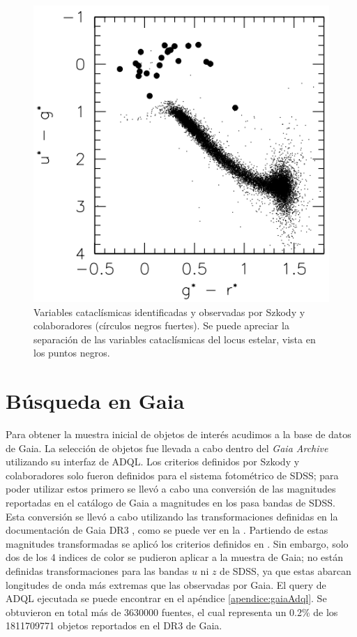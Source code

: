 \begin{figure}[!ht]
	\includegraphics[scale=0.4]{Muestra/Secciones/Figures/ug-gr_Szkody2002.png}

	\caption{Variables cataclísmicas identificadas y observadas por Szkody y
		colaboradores (círculos negros fuertes). Se puede apreciar la separación
		de las variables cataclísmicas del locus estelar, vista en los puntos
		negros. }
	\label{szkody2002ColorColorVCs}
\end{figure}

\section{Búsqueda en Gaia}

Para obtener la muestra inicial de objetos de interés acudimos a la base de
datos de Gaia. La selección de objetos fue llevada a cabo dentro del
\textit{Gaia Archive} utilizando su interfaz de ADQL. Los criterios
definidos por Szkody y colaboradores solo fueron definidos para el sistema
fotométrico de SDSS; para poder utilizar estos primero se llevó a cabo una
conversión de las magnitudes reportadas en el catálogo de Gaia a magnitudes en
los pasa bandas de SDSS. Esta conversión se llevó a cabo utilizando las
transformaciones definidas en la documentación de Gaia DR3
, como se puede ver en la
. Partiendo de estas magnitudes
transformadas se aplicó los criterios definidos en
. Sin embargo, solo dos de los 4 indices
de color se pudieron aplicar a la muestra de Gaia; no están definidas
transformaciones para las bandas $u$ ni $z$ de SDSS, ya que estas abarcan
longitudes de onda más extremas que las observadas por Gaia. El query de ADQL
ejecutada se puede encontrar en el apéndice \ref{apendice:gaiaAdql}. Se
obtuvieron en total más de \num{3630000} fuentes, el cual representa un 0.2\% de
los \num{1811709771} objetos reportados en el DR3 de Gaia. 

